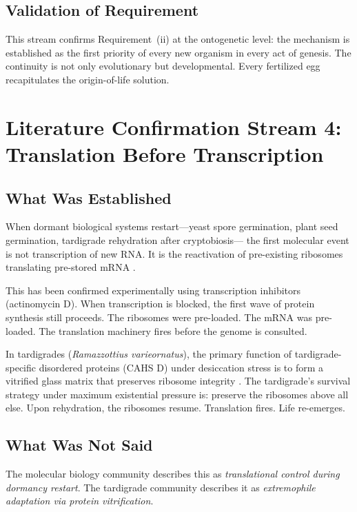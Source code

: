 \documentclass[11pt]{article}
\theoremstyle{definition}
\begin{document}
\subsection{Validation of Requirement}

This stream confirms Requirement~(ii) at the ontogenetic level:
the mechanism is established as the first priority of every
new organism in every act of genesis.
The continuity is not only evolutionary but developmental.
Every fertilized egg recapitulates the origin-of-life solution.

\section{Literature Confirmation Stream 4:\\
Translation Before Transcription}
\label{sec:literature4}

\subsection{What Was Established}

When dormant biological systems restart---yeast spore germination,
plant seed germination, tardigrade rehydration after cryptobiosis---
the first molecular event is not transcription of new RNA.
It is the reactivation of pre-existing ribosomes translating
pre-stored mRNA \cite{Plante2020}.

This has been confirmed experimentally using transcription
inhibitors (actinomycin D).
When transcription is blocked, the first wave of protein synthesis
still proceeds.
The ribosomes were pre-loaded.
The mRNA was pre-loaded.
The translation machinery fires before the genome is consulted.

In tardigrades (\textit{Ramazzottius varieornatus}), the primary
function of tardigrade-specific disordered proteins (CAHS D)
under desiccation stress is to form a vitrified glass matrix
that preserves ribosome integrity \cite{Boothby2017,Arakawa2024}.
The tardigrade's survival strategy under maximum existential
pressure is: preserve the ribosomes above all else.
Upon rehydration, the ribosomes resume.
Translation fires.
Life re-emerges.

\subsection{What Was Not Said}

The molecular biology community describes this as
\emph{translational control during dormancy restart}.
The tardigrade community describes it as
\emph{extremophile adaptation via protein vitrification}.
\end{document}
